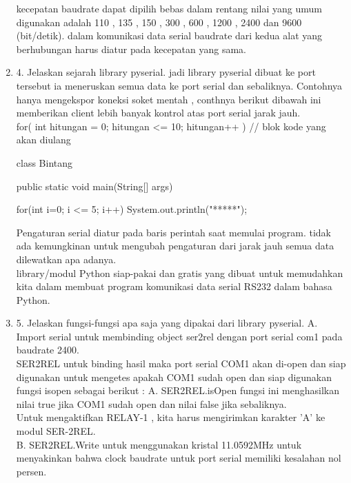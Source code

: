 \begin{enumerate}
kecepatan baudrate dapat dipilih bebas dalam rentang nilai yang umum digunakan adalah 110 , 135 , 150 , 300 , 600 , 1200 , 2400 dan 9600 (bit/detik). dalam komunikasi data serial baudrate dari kedua alat yang berhubungan harus diatur pada kecepatan yang sama.\\

\item 4. Jelaskan sejarah library pyserial.
jadi library pyserial dibuat ke port tersebut ia meneruskan semua data ke port serial dan sebaliknya. Contohnya hanya mengekspor koneksi soket mentah , conthnya berikut dibawah ini memberikan client lebih banyak kontrol atas port serial jarak jauh.\\

for( int hitungan = 0; hitungan <= 10; hitungan++ ){
    // blok kode yang akan diulang
}

class Bintang{
    public static void main(String[] args){

        for(int i=0; i <= 5; i++){
            System.out.println("*****");
        }

    }
}
Pengaturan serial diatur pada baris perintah saat memulai program. tidak ada kemungkinan untuk mengubah pengaturan dari jarak jauh semua data dilewatkan apa adanya.\\

library/modul Python siap-pakai dan gratis yang dibuat untuk memudahkan kita dalam membuat program komunikasi data serial RS232 dalam bahasa Python.\\

\item 5. Jelaskan fungsi-fungsi apa saja yang dipakai dari library pyserial.
A. Import serial untuk membinding object ser2rel dengan port serial com1 pada baudrate 2400.\\

SER2REL untuk binding hasil maka port serial COM1 akan di-open dan siap digunakan untuk mengetes apakah COM1 sudah open dan siap digunakan fungsi isopen sebagai berikut :
A. SER2REL.isOpen fungsi ini menghasilkan nilai true jika COM1 sudah open dan nilai false jika sebaliknya.\\
Untuk mengaktifkan RELAY-1 , kita harus mengirimkan karakter 'A' ke modul SER-2REL.\\

B. SER2REL.Write untuk menggunakan kristal 11.0592MHz untuk menyakinkan bahwa clock baudrate untuk port serial memiliki kesalahan nol persen.\\


\end{enumerate}
